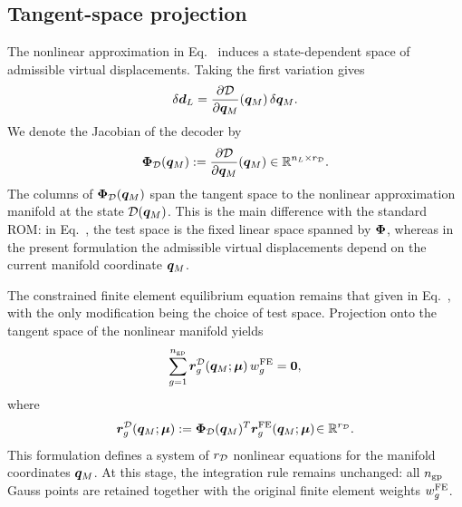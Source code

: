 \documentclass[11pt,a4paper]{article}
\newcommand{\PROMPT}[1]{ }
\begin{document}
\subsection{Tangent-space projection}
\label{subsec:tangent_projection}

The nonlinear approximation in Eq.~ induces a state-dependent
space of admissible virtual displacements. Taking the first variation gives
\begin{equation}
\label{eq:virtual_dred_manifold}
\delta\bm{d}_L
=
\dfrac{\partial \mathcal{\boldsymbol{D}}}{\partial \bm{q}_M}(\bm{q}_M)\,\delta\bm{q}_M .
\end{equation}
We denote the Jacobian of the decoder by
\begin{equation}
\label{eq:PhiD_definition}
\bm{\Phi}_{\mathcal{D}}(\bm{q}_M)
:=
\dfrac{\partial \mathcal{\boldsymbol{D}}}{\partial \bm{q}_M}(\bm{q}_M)
\in \mathbb{R}^{n_L\times r_{\mathcal{D}}}.
\end{equation}
The columns of $\bm{\Phi}_{\mathcal{D}}(\bm{q}_M)$ span the tangent space to the nonlinear
approximation manifold at the state $\mathcal{\boldsymbol{D}}(\bm{q}_M)$. This is the main difference
with the standard ROM: in Eq.~, the test space
is the fixed linear space spanned by $\bm{\Phi}$, whereas in the present
formulation the admissible virtual displacements depend on the current
manifold coordinate $\bm{q}_M$.

The constrained finite element equilibrium equation remains that given in
Eq.~, with the only modification being the choice of test
space. Projection onto the tangent space of the nonlinear manifold yields
\begin{equation}
\label{eq:manifold_ROM_equilibrium_FE_weights}
\sum_{g=1}^{n_{\mathrm{gp}}}
\bm{r}^{\mathcal{D}}_{g}(\bm{q}_M;\bm{\mu})\,w^{\mathrm{FE}}_{g}
=
\bm{0},
\end{equation}
where
\begin{equation}
\label{eq:rDec_definition}
\bm{r}^{\mathcal{D}}_{g}(\bm{q}_M;\bm{\mu})
:=
\bm{\Phi}_{\mathcal{D}}(\bm{q}_M)^T
\bm{r}^{\mathrm{FE}}_{g}(\bm{q}_M;\bm{\mu})\!
\in \mathbb{R}^{r_{\mathcal{D}}}.
\end{equation}
This formulation defines a system of $r_{\mathcal{D}}$ nonlinear equations for the
manifold coordinates $\bm{q}_M$. At this stage, the integration rule remains
unchanged: all $n_{\mathrm{gp}}$ Gauss points are retained together with the original
finite element weights $w^{\mathrm{FE}}_{g}$.


\PROMPT{}


%
\end{document}

